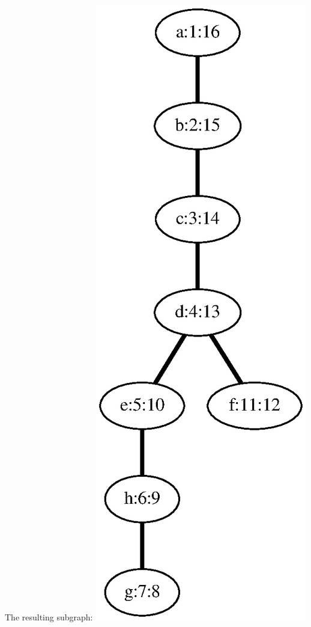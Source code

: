 \documentclass{article}
\begin{document}
\begin{minipage}{0.22727272727272727\linewidth}
The resulting subgraph: 
\includegraphics[width=\linewidth]{dfs_undirected_classroom_17.eps}
\end{minipage}
\end{document}
